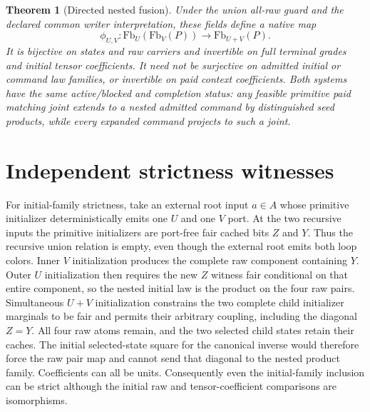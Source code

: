 \documentclass[11pt]{article}\usepackage{amsmath,amssymb,amsthm,geometry}\geometry{margin=1in}\newtheorem{lemma}{Lemma}\newtheorem{theorem}[lemma]{Theorem}
\begin{document}
\begin{theorem}[Directed nested fusion]
Under the union all-raw guard and the declared common writer interpretation, these fields define a native map
\[
               \phi_{U,V}:\mathrm{Fb}_U(\mathrm{Fb}_V(P))
                              \longrightarrow\mathrm{Fb}_{U+V}(P).
\]
It is bijective on states and raw carriers and invertible on full terminal grades and initial tensor coefficients. It need not be surjective on admitted initial or command law families, or invertible on paid context coefficients. Both systems have the same active/blocked and completion status: any feasible primitive paid matching joint extends to a nested admitted command by distinguished seed products, while every expanded command projects to such a joint.
\end{theorem}

\section{Independent strictness witnesses}
For initial-family strictness, take an external root input $a\in A$ whose primitive initializer deterministically emits one $U$ and one $V$ port. At the two recursive inputs the primitive initializers are port-free fair cached bits $Z$ and $Y$. Thus the recursive union relation is empty, even though the external root emits both loop colors. Inner $V$ initialization produces the complete raw component containing $Y$. Outer $U$ initialization then requires the new $Z$ witness fair conditional on that entire component, so the nested initial law is the product on the four raw pairs. Simultaneous $U+V$ initialization constrains the two complete child initializer marginals to be fair and permits their arbitrary coupling, including the diagonal $Z=Y$. All four raw atoms remain, and the two selected child states retain their caches. The initial selected-state square for the canonical inverse would therefore force the raw pair map and cannot send that diagonal to the nested product family. Coefficients can all be units. Consequently even the initial-family inclusion can be strict although the initial raw and tensor-coefficient comparisons are isomorphisms.
\end{document}

